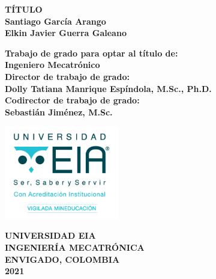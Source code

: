 \documentclass[11pt]{report} %
\begin{document}
\begin{titlepage} %
\begin{center}

\begin{Large}
\vspace*{1cm}
\textbf{TÍTULO}\\[3.5cm]

\textbf{Santiago García Arango}\\
\textbf{Elkin Javier Guerra Galeano}\\[2cm]
\end{Large}

\begin{large}
\textbf{Trabajo de grado para optar al título de:}\\
\textbf{Ingeniero Mecatrónico}\\[2cm]

\textbf{Director de trabajo de grado:}\\
\textbf{Dolly Tatiana Manrique Espíndola, M.Sc., Ph.D.}\\[1cm]

\textbf{Codirector de trabajo de grado:}\\
\textbf{Sebastián Jiménez, M.Sc.}\\
\end{large}

\vfill

\includegraphics[width=5cm]{assets/imgs/logoeia.png}\\

\begin{large}
\textbf{UNIVERSIDAD EIA}\\
\textbf{INGENIERÍA MECATRÓNICA}\\
\textbf{ENVIGADO, COLOMBIA}\\
\textbf{2021}\\
\end{large}
\end{center}
\end{titlepage}


\end{document}
